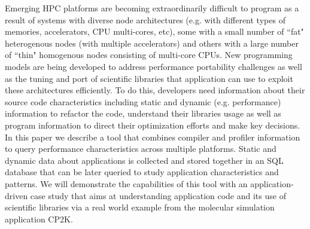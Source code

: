Emerging HPC platforms are becoming extraordinarily difficult to program as a result of systems with diverse node architectures (e.g. with different types of memories, accelerators, \acs{CPU} multi-cores, etc), some with a small number of ``fat" heterogenous nodes (with multiple accelerators) and others with a large number of ``thin" homogenous nodes consisting of multi-core \acs{CPU}s.
New programming models are being developed to address performance portability challenges as well as the tuning and port of scientific libraries that application can use to exploit  these architectures efficiently. 
To do this, developers need information about their source code characteristics including static and dynamic (e.g. performance) information to refactor the code, understand their libraries usage as well as program information to direct their optimization efforts and make key decisions.
In this paper we describe a tool that combines compiler and profiler information to query performance characteristics across multiple platforms.
Static and dynamic data about applications is collected and stored together in an \acs{SQL} database that can be later queried to study application characteristics and patterns.
We will demonstrate the capabilities of this tool with an application-driven case study that aims at understanding application code and its use of scientific libraries via a real world example from the molecular simulation application CP2K.
